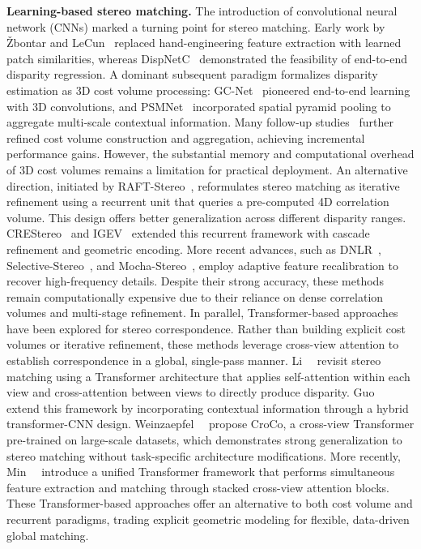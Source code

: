  \noindent\textbf{Learning-based stereo matching.} The introduction of convolutional neural network (CNNs) marked a turning point for stereo matching.
 Early work by Žbontar and LeCun~\cite{zbontar2016stereo} replaced hand-engineering feature extraction with learned patch similarities, whereas DispNetC~\cite{mayer2016large} demonstrated the feasibility of end-to-end disparity regression.
 A dominant subsequent paradigm formalizes disparity estimation as 3D cost volume processing: GC-Net~\cite{kendall2017end} pioneered end-to-end learning with 3D convolutions, and PSMNet~\cite{chang2018pyramid} incorporated spatial pyramid pooling to aggregate multi‑scale contextual information.
 Many follow‑up studies~\cite{guo2019group,cheng2019learning,xu2022attention,shen2022pcw} further refined cost volume construction and aggregation, achieving incremental performance gains.
 However, the substantial memory and computational overhead of 3D cost volumes remains a limitation for practical deployment.
 An alternative direction, initiated by RAFT-Stereo~\cite{lipson2021raft}, reformulates stereo matching as iterative refinement using a recurrent unit that queries a pre-computed 4D correlation volume.
 This design offers better generalization across different disparity ranges.
 CREStereo~\cite{li2022practical,jing2023uncertainty} and IGEV~\cite{xu2023iterative} extended this recurrent framework with cascade refinement and geometric encoding.
 More recent advances, such as DNLR~\cite{zhao2023high}, Selective-Stereo~\cite{wang2024selective}, and Mocha-Stereo~\cite{chen2024motif}, employ adaptive feature recalibration to recover high-frequency details.
 Despite their strong accuracy, these methods remain computationally expensive due to their reliance on dense correlation volumes and multi-stage refinement.
 In parallel, Transformer-based approaches have been explored for stereo correspondence.
 Rather than building explicit cost volumes or iterative refinement, these methods leverage cross-view attention to establish correspondence in a global, single-pass manner.
 Li~\etal~\cite{li2021revisiting} revisit stereo matching using a Transformer architecture that applies self-attention within each view and cross-attention between views to directly produce disparity.
 Guo~\etal~\cite{guo2022context} extend this framework by incorporating contextual information through a hybrid transformer-CNN design.
 Weinzaepfel~\etal~\cite{weinzaepfel2023croco} propose CroCo, a cross-view Transformer pre-trained on large-scale datasets, which demonstrates strong generalization to stereo matching without task-specific architecture modifications.
 More recently, Min~\etal~\cite{min2025s} introduce a unified Transformer framework that performs simultaneous feature extraction and matching through stacked cross-view attention blocks.
 These Transformer-based approaches offer an alternative to both cost volume and recurrent paradigms, trading explicit geometric modeling for flexible, data-driven global matching.
 
